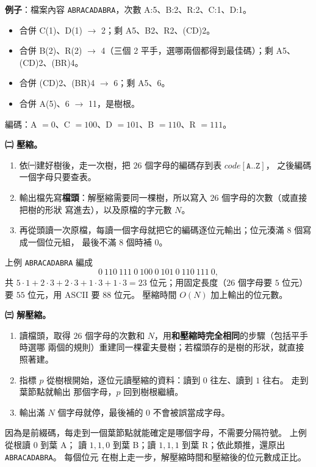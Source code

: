 \begin{pastsoln}
\textbf{例子}：檔案內容 \texttt{ABRACADABRA}，次數 A:5、B:2、R:2、C:1、D:1。
\begin{itemize}[nosep]
\item 合併 C(1)、D(1) $\to$ 2；剩 A5、B2、R2、(CD)2。
\item 合併 B(2)、R(2) $\to$ 4（三個 2 平手，選哪兩個都得到最佳碼）；剩 A5、(CD)2、(BR)4。
\item 合併 (CD)2、(BR)4 $\to$ 6；剩 A5、6。
\item 合併 A(5)、6 $\to$ 11，是樹根。
\end{itemize}
編碼：A $= 0$、C $= 100$、D $= 101$、B $= 110$、R $= 111$。

\textbf{㈡ 壓縮。}
\begin{enumerate}[nosep]
\item 依㈠建好樹後，走一次樹，把 $26$ 個字母的編碼存到表 $\mathit{code}[\texttt{A}..\texttt{Z}]$，
之後編碼一個字母只要查表。
\item 輸出檔先寫\textbf{檔頭}：解壓縮需要同一棵樹，所以寫入 $26$ 個字母的次數（或直接把樹的形狀
寫進去），以及原檔的字元數 $N$。
\item 再從頭讀一次原檔，每讀一個字母就把它的編碼逐位元輸出；位元湊滿 $8$ 個寫成一個位元組，
最後不滿 $8$ 個時補 $0$。
\end{enumerate}
上例 \texttt{ABRACADABRA} 編成
\[
0\ 110\ 111\ 0\ 100\ 0\ 101\ 0\ 110\ 111\ 0,
\]
共 $5 \cdot 1 + 2 \cdot 3 + 2 \cdot 3 + 1 \cdot 3 + 1 \cdot 3 = 23$ 位元；用固定長度（$26$ 個字母要
$5$ 位元）要 $55$ 位元，用 ASCII 要 $88$ 位元。 壓縮時間 $O(N)$ 加上輸出的位元數。

\textbf{㈢ 解壓縮。}
\begin{enumerate}[nosep]
\item 讀檔頭，取得 $26$ 個字母的次數和 $N$，用\textbf{和壓縮時完全相同}的步驟（包括平手時選哪
兩個的規則）重建同一棵霍夫曼樹；若檔頭存的是樹的形狀，就直接照著建。
\item 指標 $p$ 從樹根開始，逐位元讀壓縮的資料：讀到 $0$ 往左、讀到 $1$ 往右。 走到葉節點就輸出
那個字母，$p$ 回到樹根繼續。
\item 輸出滿 $N$ 個字母就停，最後補的 $0$ 不會被誤當成字母。
\end{enumerate}
因為是前綴碼，每走到一個葉節點就能確定是哪個字母，不需要分隔符號。 上例從根讀 $0$ 到葉 A；
讀 $1, 1, 0$ 到葉 B；讀 $1, 1, 1$ 到葉 R；依此類推，還原出 \texttt{ABRACADABRA}。 每個位元
在樹上走一步，解壓縮時間和壓縮後的位元數成正比。
\end{pastsoln}
